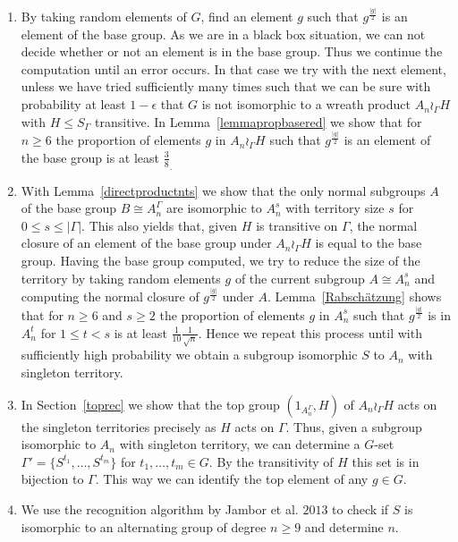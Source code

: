 \begin{enumerate}
\item \label{stepone}
By taking random elements of $G$, find an element $g$ such that $g^{\frac{|g|}{2}}$ is an element of the base group.
As we are in a black box situation, we can not decide whether or not an element is in the base group.
Thus we continue the computation until an error occurs.
In that case we try with the next element, unless we have tried sufficiently many times such that we can be sure with probability at least $1-\epsilon$ that $G$ is not
isomorphic to a wreath product $A_n \wr_\Gamma H$ with $H\leq S_\Gamma$ transitive.
In Lemma~\ref{lemmapropbasered}
we show that for $n\geq 6$ the proportion of elements $g$ in $A_n\wr_\Gamma H$ such that $g^{\frac{|g|}{2}}$ is an element of the base group is at least $\frac{3}{8}_.$
\item With Lemma~\ref{directproductnts} we show that the only normal subgroups $A$ of the base group $B\cong A_n^\Gamma$ are isomorphic to $A_n^s$ with territory size $s$ for $0\leq s \leq |\Gamma|$.
This also yields that, given $H$ is transitive on $\Gamma$, the normal closure of an element of the base group under $A_n\wr_\Gamma H$ is equal to the base group.
Having the base group computed, we try to reduce the size of the territory by taking random elements $g$ of the current subgroup $A\cong A_n^s$
and computing the normal closure of $g^{\frac{|g|}{2}}$ under $A$.
Lemma~\ref{Rabschätzung} shows that for $n\geq 6$ and $s\geq 2$ the proportion of elements $g$ in $A_n^s$
such that $g^{\frac{|g|}{2}}$ is in $A_n^t$ for $1\leq t <s $ is at least $\frac{1}{10}\frac{1}{\sqrt n}$.
Hence we repeat this process until with sufficiently high probability we obtain a subgroup isomorphic $S$ to $A_n$ with singleton territory.
\item In Section~\ref{toprec} we show that the top group $(1_{A_n^\Gamma}, H)$ of $A_n\wr_\Gamma H$ acts on the singleton territories precisely as $H$ acts on $\Gamma$.
Thus, given a subgroup isomorphic to $A_n$ with singleton territory, we can determine a $G$-set $\Gamma'=\{S^{t_1},\dots,S^{t_m}\}$ for $t_1,\dots,t_m\in G$.
By the transitivity of $H$ this set is in bijection to $\Gamma$.
This way we can identify the top element of any $g\in G$.
\item \label{recstep}
We use the recognition algorithm by Jambor et al. $2013$ \cite{jambor2013fast} to check if $S$ is isomorphic to an alternating group of degree $n\geq 9$ and determine $n$.

\end{enumerate}
